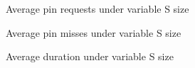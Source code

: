 \documentclass{article}
\begin{document}
\newpage
\begin{figure}[!htbp]
  \centering
  \caption{Average pin requests under variable S size}
    \label{fig: 4-1}
\end{figure}
\begin{figure}[!htbp]
  \centering
  \caption{Average pin misses under variable S size}
    \label{fig: 4-2}
\end{figure}
\begin{figure}[!htbp]
  \centering
  \caption{Average duration under variable S size}
    \label{fig: 4-3}
\end{figure}


\newpage
\end{document}
